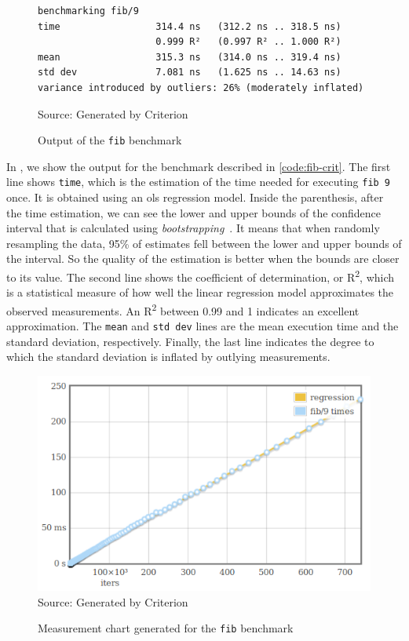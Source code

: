 \begin{figure}[htp]
  \centering
  \caption{Output of the \texttt{fib} benchmark}
  \begin{verbatim}
benchmarking fib/9
time                 314.4 ns   (312.2 ns .. 318.5 ns)
                     0.999 R²   (0.997 R² .. 1.000 R²)
mean                 315.3 ns   (314.0 ns .. 319.4 ns)
std dev              7.081 ns   (1.625 ns .. 14.63 ns)
variance introduced by outliers: 26% (moderately inflated)
  \end{verbatim}
  \footnotesize{Source: Generated by Criterion}
  \label{fig:fib-output}
\end{figure}

In , we show the output for the benchmark described in \autoref{code:fib-crit}. The first line shows \texttt{time}, which is the estimation of the time needed for executing \texttt{fib 9} once. It is obtained using an \ac{ols} regression model. Inside the parenthesis, after the time estimation, we can see the lower and upper bounds of the confidence interval that is calculated using \emph{bootstrapping}~\cite{davison:1997}. It means that when randomly resampling the data, 95\% of estimates fell between the lower and upper bounds of the interval. So the quality of the estimation is better when the bounds are closer to its value. The second line shows the coefficient of determination, or R\textsuperscript{2}, which is a statistical measure of how well the linear regression model approximates the observed measurements. An R\textsuperscript{2} between 0.99 and 1 indicates an excellent approximation. The \texttt{mean} and \texttt{std dev} lines are the mean execution time and the standard deviation, respectively. Finally, the last line indicates the degree to which the standard deviation is inflated by outlying measurements.

\begin{figure}[htp]
  \centering
  \caption{Measurement chart generated for the \texttt{fib} benchmark}
  \includegraphics[width=.6\columnwidth]{images/criterion-chart} \\
  \footnotesize{Source: Generated by Criterion}
  \label{fig:crit-chart}
\end{figure}

